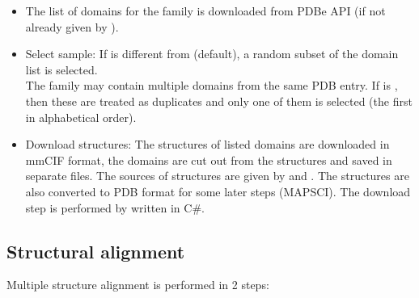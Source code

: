 \documentclass{article}
\begin{document}
\begin{itemize}
  \item
    The list of domains for the family is downloaded from PDBe API
    (if not already given by ).
  \item
    Select sample: If  is different from
     (default), a random subset of the domain list is selected.\\
    The family may contain multiple domains from the same PDB entry. If 
     is , then
    these are treated as duplicates and only one of them is selected (the
    first in alphabetical order).
  \item
    Download structures: The structures of listed domains are downloaded
    in mmCIF format, the domains are cut out from the structures and saved in
    separate files. The sources of structures are given by
     and
    . The structures are also
    converted to PDB format for some later steps (MAPSCI). The download
    step is performed by  written in C\#.
  \end{itemize}
  


\subsection{Structural alignment}

Multiple structure alignment is performed in 2 steps:
\end{document}
